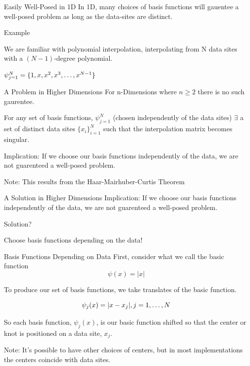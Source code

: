 \documentclass[12pt,t]{beamer}
\newcommand{\subt}[1]{{\footnotesize \color{subtitle} {#1}}}
\begin{document}
\begin{frame}{Easily Well-Posed in 1D}
In 1D, many choices of basis functions will gauentee a well-posed problem as long as the data-sites are distinct. 
\bigskip

\subt{Example}

We are familiar with \subt{polynomial interpolation}, interpolating from N data sites with a $(N-1)$-degree polynomial. 
\begin{center}
$\psi_{j=1}^N=\{1,x,x^2,x^3, \mathellipsis, x^{N-1}\}$
\end{center}
\note{}
\end{frame}

\begin{frame}{A Problem in Higher Dimensions}
For n-Dimensions where $n\geq 2$ there is no such gaurentee.
\bigskip

For any set of basis functions, $\psi_{j=1}^N$ (chosen independently of the data sites) $\exists$ a set of distinct data sites $\{x_i\}_{i=1}^N$
such that the interpolation matrix becomes singular. 
\bigskip

\subt{Implication:}
If we choose our basis functions independently of the data, we are not guarenteed a well-posed problem.
\bigskip

\subt{Note:}
This results from the Haar-Mairhuber-Curtis Theorem


\note{}
\end{frame}

\begin{frame}[c]{A Solution in Higher Dimensions}
\subt{Implication:}
If we choose our basis functions independently of the data, we are not guarenteed a well-posed problem.
\bigskip

\subt{Solution?}

Choose basis functions depending on the data!
\bigskip

\note{}
\end{frame}

\begin{frame}{Basis Functions Depending on Data}
First, consider what we call the \subt{basic function}\\
\begin{equation*}
\psi(x)=|x|
\end{equation*}

To produce our set of basis functions, we take translates of the basic function.

\begin{equation*}
\psi_j(x)=|x-x_j|, j=1, \mathellipsis, N
\end{equation*}

So each basis function, $\psi_j(x)$, is our basic function shifted so that the \subt{center} or \subt{knot} is positioned on a data site, $x_j$.
\bigskip

\subt{Note:} It's possible to have other choices of centers, but in most implementations the centers coincide with data sites.

\end{frame}
\end{document}
